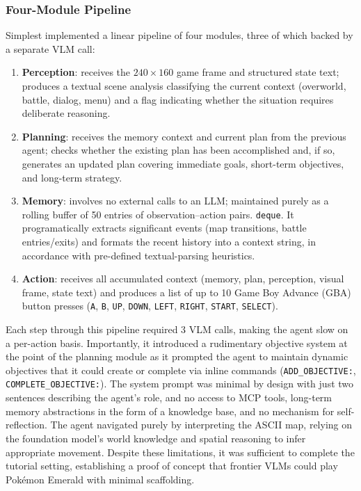 \subsubsection{Four-Module Pipeline}\label{sec:four_module}

\pokeagent{} Simplest implemented a linear pipeline of four modules, three of which backed by a separate VLM call:

\begin{enumerate}[nosep]
    \item \textbf{Perception}: receives the $240 \times 160$ game frame and structured state text; produces a textual scene analysis classifying the current context (overworld, battle, dialog, menu) and a flag indicating whether the situation requires deliberate reasoning.
    \item \textbf{Planning}: receives the memory context and current plan from the previous agent; checks whether the existing plan has been accomplished and, if so, generates an updated plan covering immediate goals, short-term objectives, and long-term strategy.
    \item \textbf{Memory}: involves no external calls to an LLM; maintained purely as a rolling buffer of 50 entries of observation--action pairs. \texttt{deque}. It programatically extracts significant events (map transitions, battle entries/exits) and formats the recent history into a context string, in accordance with pre-defined textual-parsing heuristics.
    \item \textbf{Action}: receives all accumulated context (memory, plan, perception, visual frame, state text) and produces a list of up to 10 Game Boy Advance (GBA) button presses (\texttt{A}, \texttt{B}, \texttt{UP}, \texttt{DOWN}, \texttt{LEFT}, \texttt{RIGHT}, \texttt{START}, \texttt{SELECT}).
\end{enumerate}

Each step through this pipeline required 3 VLM calls, making the agent slow on a per-action basis. Importantly, it introduced a rudimentary objective system at the point of the planning module as it prompted the agent to maintain dynamic objectives that it could create or complete via inline commands (\texttt{ADD\_OBJECTIVE:}, \texttt{COMPLETE\_OBJECTIVE:}). The system prompt was minimal by design with just two sentences describing the agent's role, and no access to MCP tools, long-term memory abstractions in the form of a knowledge base, and no mechanism for self-reflection. The agent navigated purely by interpreting the ASCII map, relying on the foundation model's world knowledge and spatial reasoning to infer appropriate movement. Despite these limitations, it was sufficient to complete the tutorial setting, establishing a proof of concept that frontier VLMs could play Pok\'{e}mon Emerald with minimal scaffolding.


